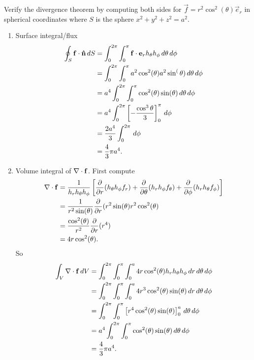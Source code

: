 \documentclass[10pt, a4paper]{article}
\begin{document}
\begin{example}
    Verify the divergence theorem by computing both sides for $\vec{f} = r ^ 2\cos ^ 2(\theta)\vec{e}_r$ in spherical coordinates where $S$ is the sphere $x ^ 2 + y ^ 2 + z ^ 2 = a ^ 2$.

    \begin{enumerate}[label = (\arabic*)]
        \item Surface integral/flux
        \begin{align*}
            \oint_{S}\mathbf{f}\cdot\mathbf{\hat{n}}\,dS &= \int_{0}^{2\pi}\int_{0}^{\pi}\mathbf{f}\cdot\mathbf{e}_rh_{\theta}h_{\phi}\,d\theta\,d\phi  \\
            &= \int_{0}^{2\pi}\int_{0}^{\pi}a ^ 2\cos ^ 2(\theta)a ^ 2\sin ^ (\theta)\,d\theta\,d\phi \\
            &= a ^ 4\int_{0}^{2\pi}\int_{0}^{\pi}\cos ^ 2(\theta)\sin(\theta)\,d\theta\,d\phi \\
            &= a ^ 4\int_{0}^{2\pi}\left[-\frac{\cos ^ 3\theta}{3}\right]_{0}^{\pi}\,d\phi \\
            &= \frac{2a ^ 4}{3}\int_{0}^{2\pi}\,d\phi \\
            &= \frac{4}{3}\pi a ^ 4.
        \end{align*}

        \item Volume integral of $\mathbf{\nabla} \cdot \mathbf{f}$.
        First compute
        \begin{align*}
            \mathbf{\nabla} \cdot \mathbf{f} &= \frac{1}{h_rh_{\theta}h_{\phi}}\left[\frac{\partial }{\partial r}(h_{\theta}h_{\phi}f_r) + \frac{\partial }{\partial \theta}(h_rh_{\phi}f_{\theta}) + \frac{\partial }{\partial \phi}(h_rh_{\theta}f_{\phi})\right] \\
            &= \frac{1}{r ^ 2\sin(\theta)}\frac{\partial }{\partial r}(r ^ 2\sin(\theta)r ^ 2\cos ^ 2(\theta) \\
            &= \frac{\cos ^ 2(\theta)}{r ^ 2}\frac{\partial }{\partial r}(r ^ 4) \\
            &= 4r\cos ^ 2(\theta).
        \end{align*}
        So
        \begin{align*}
            \int_{V}\mathbf{\nabla}\cdot\mathbf{f}\,dV &= \int_{0}^{2\pi}\int_{0}^{\pi}\int_{0}^{a}4r\cos ^ 2(\theta)h_rh_{\theta}h_{\phi}\,dr\,d\theta\,d\phi \\
            &= \int_{0}^{2\pi}\int_{0}^{\pi}\int_{0}^{a}4r ^ 3\cos ^ 2(\theta)\sin(\theta)\,dr\,d\theta\,d\phi \\
            &= \int_{0}^{2\pi}\int_{0}^{\pi}\left[r ^ 4\cos ^ 2(\theta)\sin(\theta)\right]_{0}^{a}\,d\theta\,d\phi \\
            &= a ^ 4\int_{0}^{2\pi}\int_{0}^{\pi}\cos ^ 2(\theta)\sin(\theta)\,d\theta\,d\phi \\
            &= \frac{4}{3}\pi a ^ 4.
        \end{align*}
    \end{enumerate}
\end{example}
\end{document}
